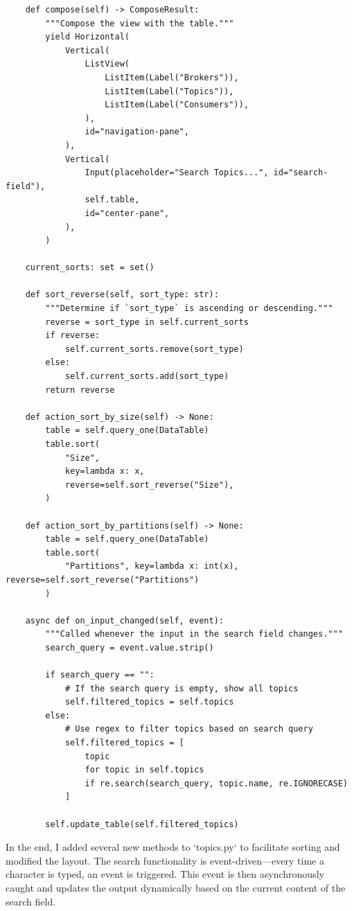 \documentclass[10pt , a4paper]{report}
\newenvironment{code}{\captionsetup{type=listing}}{}
\begin{document}
\begin{code}
  \begin{verbatim}
    def compose(self) -> ComposeResult:
        """Compose the view with the table."""
        yield Horizontal(
            Vertical(
                ListView(
                    ListItem(Label("Brokers")),
                    ListItem(Label("Topics")),
                    ListItem(Label("Consumers")),
                ),
                id="navigation-pane",
            ),
            Vertical(
                Input(placeholder="Search Topics...", id="search-field"),
                self.table,
                id="center-pane",
            ),
        )

    current_sorts: set = set()

    def sort_reverse(self, sort_type: str):
        """Determine if `sort_type` is ascending or descending."""
        reverse = sort_type in self.current_sorts
        if reverse:
            self.current_sorts.remove(sort_type)
        else:
            self.current_sorts.add(sort_type)
        return reverse

    def action_sort_by_size(self) -> None:
        table = self.query_one(DataTable)
        table.sort(
            "Size",
            key=lambda x: x,
            reverse=self.sort_reverse("Size"),
        )

    def action_sort_by_partitions(self) -> None:
        table = self.query_one(DataTable)
        table.sort(
            "Partitions", key=lambda x: int(x), reverse=self.sort_reverse("Partitions")
        )

    async def on_input_changed(self, event):
        """Called whenever the input in the search field changes."""
        search_query = event.value.strip()

        if search_query == "":
            # If the search query is empty, show all topics
            self.filtered_topics = self.topics
        else:
            # Use regex to filter topics based on search query
            self.filtered_topics = [
                topic
                for topic in self.topics
                if re.search(search_query, topic.name, re.IGNORECASE)
            ]

        self.update_table(self.filtered_topics)
  \end{verbatim}
\end{code}

In the end, I added several new methods to `topics.py` to facilitate sorting and modified the layout. The search functionality is event-driven—every time a character is typed, an event is triggered. This event is then asynchronously caught and updates the output dynamically based on the current content of the search field. 
\end{document}
